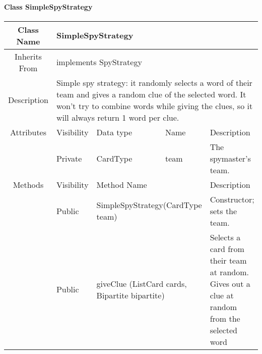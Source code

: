 \paragraph{Class SimpleSpyStrategy}\mbox{}
\begin{tabularx}{\textwidth}{|c||l|l|l|X|}
    \hline
    \cellcolor{lightgray}Class Name & \multicolumn{4}{X|}{SimpleSpyStrategy}\\
    \hline
    \cellcolor{lightgray}Inherits From & \multicolumn{4}{p{12cm}|}{implements SpyStrategy}\\
    \hline
    \cellcolor{lightgray}Description & \multicolumn{4}{p{12cm}|}{Simple spy strategy: it randomly selects a word of their team and gives a random clue of the selected word. It won't try to combine words while giving the clues, so it will always return 1 word per clue.}\\
    \hline\hline
    
    \cellcolor{lightgray}Attributes & \cellcolor{lightgray}Visibility & \cellcolor{lightgray}Data type & \cellcolor{lightgray}Name & \cellcolor{lightgray}Description\\\cline{2-5}
    \cellcolor{lightgray} & Private & CardType & team & The spymaster's team.\\
    \hline\hline
    
    \cellcolor{lightgray}Methods & \cellcolor{lightgray}Visibility & \multicolumn{2}{l|}{\cellcolor{lightgray}Method Name} & \cellcolor{lightgray}Description\\\cline{2-5}
    \cellcolor{lightgray} & Public & \multicolumn{2}{X|}{SimpleSpyStrategy(CardType team)} & Constructor; sets the team.\\\cline{2-5}
    \cellcolor{lightgray} & Public & \multicolumn{2}{X|}{giveClue (List\textlangle{}Card\textrangle{} cards, Bipartite bipartite)} & Selects a card from their team at random. Gives out a clue at random from the selected word\\
    \hline
\end{tabularx}